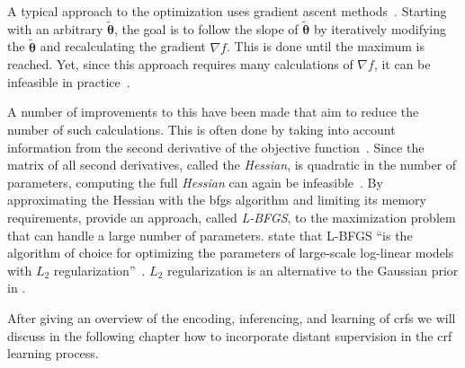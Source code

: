 \bigskip

A typical approach to the optimization uses gradient ascent methods~\citep{koller2009probabilistic}.
Starting with an arbitrary $\bm{\tilde{\theta}}$, the goal is to follow the slope of $\bm{\tilde{\theta}}$ by iteratively modifying the $\bm{\tilde{\theta}}$ and recalculating the gradient $\nabla f$.
This is done until the maximum is reached.
Yet, since this approach requires many calculations of $\nabla f$, it can be infeasible in practice~\citep{sutton2010introduction}.

A number of improvements to this have been made that aim to reduce the number of such calculations.
This is often done by taking into account information from the second derivative of the \gls{objective function}~\citep{sutton2010introduction}.
Since the matrix of all second derivatives, called the \textit{Hessian}, is quadratic in the number of parameters, computing the full \textit{Hessian} can again be infeasible~\citep{sutton2010introduction}.
By approximating the Hessian with the \gls{bfgs} algorithm and limiting its memory requirements, \citet{byrd1994representations} provide an approach, called \textit{L-BFGS}, to the maximization problem that can handle a large number of parameters.
\citet{andrew2007scalable} state that L-BFGS ``is the algorithm of choice for optimizing the parameters of large-scale log-linear models with $L_2$ regularization''~\citep{andrew2007scalable}.
$L_2$ regularization is an alternative to the Gaussian prior in .

\bigskip

After giving an overview of the encoding, inferencing, and learning of \glspl{crf} we will discuss in the following chapter how to incorporate \gls{distant supervision} in the \gls{crf} learning process.

